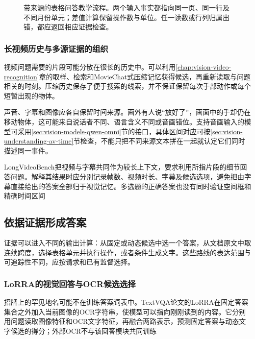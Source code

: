 \begin{figure}[htbp]
  \centering
  
  \caption{带来源的表格问答教学流程。两个输入事实都指向同一页、同一行及不同月份单元；差值计算保留操作数与单位。任一读数或行列归属出错，都应返回相应证据检查。}
  \label{fig:vision-qa-evidence}
\end{figure}
\FloatBarrier

\subsubsection{长视频历史与多源证据的组织}
\label{sec:vision-understanding-video-evidence}

视频问题需要的片段可能分散在很长的历史中。可以利用\ref{chap:vision-video-recognition}章的取样、检索和MovieChat式压缩记忆获得候选，再重新读取与问题相关的时刻。压缩历史保存了便于搜索的线索，并不保证保留每次手部动作或每个短暂出现的物体。

声音、字幕和图像应各自保留时间来源。画外有人说“放好了”，画面中的手却仍在移动物体，这可能来自说话者不同、语言含义不同或音画错位。支持音画输入的模型可采用\ref{sec:vision-models-qwen-omni}节的接口，具体区间对应可按\ref{sec:vision-understanding-av-time}节检查，不能只把不同来源文本拼在一起就认定它们同时描述同一事件。

LongVideoBench把视频与字幕共同作为较长上下文，要求利用所指片段的细节回答问题。解释其结果时应分别记录帧数、视频时长、字幕及候选选项，避免把由字幕直接给出的答案全部归于视觉记忆。多选题的正确答案也没有同时验证空间框和精确时间区间

\subsection{依据证据形成答案}
\label{sec:vision-understanding-answering}

证据可以进入不同的输出计算：从固定或动态候选中选一个答案，从文档原文中取连续跨度，选择表格单元并执行操作，或者条件生成文字。这些路线的表达范围与可追踪性不同，应按请求和已有监督选择。

\subsubsection{LoRRA的视觉回答与OCR候选选择}
\label{sec:vision-understanding-lorra}

招牌上的罕见地名可能不在训练答案词表中。TextVQA论文的LoRRA在固定答案集合之外加入当前图像的OCR字符串，使模型可以指向刚刚读到的内容。它分别用问题读取图像特征和OCR文字特征，再融合两路表示，预测固定答案与动态文字候选的得分；外部OCR不与该回答模块共同训练

